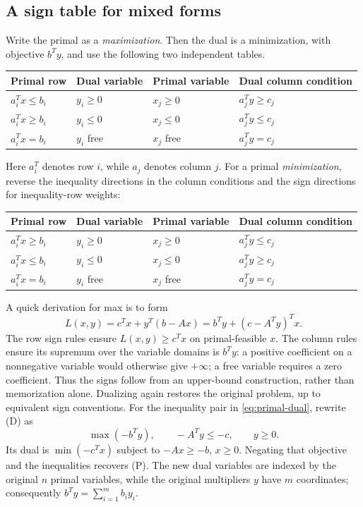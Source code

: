 \documentclass[11pt,a4paper]{article}
\begin{document}
\subsection{A sign table for mixed forms}
Write the primal as a \emph{maximization}. Then the dual is a minimization,
with objective $b^Ty$, and use the following two independent tables.
\begin{center}
  \begin{tabular}{ll@{\qquad}ll}\toprule
    Primal row & Dual variable & Primal variable & Dual column condition\\\midrule
    $a_i^Tx\leq b_i$ & $y_i\geq0$ & $x_j\geq0$ & $a_j^Ty\geq c_j$\\
    $a_i^Tx\geq b_i$ & $y_i\leq0$ & $x_j\leq0$ & $a_j^Ty\leq c_j$\\
    $a_i^Tx=b_i$ & $y_i$ free & $x_j$ free & $a_j^Ty=c_j$\\\bottomrule
  \end{tabular}
\end{center}
Here $a_i^T$ denotes row $i$, while $a_j$ denotes column $j$.
For a primal \emph{minimization}, reverse the inequality directions in the
column conditions and the sign directions for inequality-row weights:
\begin{center}
  \begin{tabular}{ll@{\qquad}ll}\toprule
    Primal row & Dual variable & Primal variable & Dual column condition\\\midrule
    $a_i^Tx\geq b_i$ & $y_i\geq0$ & $x_j\geq0$ & $a_j^Ty\leq c_j$\\
    $a_i^Tx\leq b_i$ & $y_i\leq0$ & $x_j\leq0$ & $a_j^Ty\geq c_j$\\
    $a_i^Tx=b_i$ & $y_i$ free & $x_j$ free & $a_j^Ty=c_j$\\\bottomrule
  \end{tabular}
\end{center}
A quick derivation for max is to form
\[
  L(x,y)=c^Tx+y^T(b-Ax)=b^Ty+(c-A^Ty)^Tx.
\]
The row sign rules ensure $L(x,y)\geq c^Tx$ on primal-feasible $x$.
The column rules ensure its supremum over the variable domains is $b^Ty$:
a positive coefficient on a nonnegative variable would otherwise give $+\infty$;
a free variable requires a zero coefficient. Thus the signs follow from an
upper-bound construction, rather than memorization alone.
Dualizing again restores the original problem, up to equivalent sign conventions.
For the inequality pair in \eqref{eq:primal-dual}, rewrite (D) as
\[
  \max(-b^Ty),\qquad -A^Ty\leq-c,\qquad y\geq0.
\]
Its dual is $\min(-c^Tx)$ subject to $-Ax\geq-b$, $x\geq0$.
Negating that objective and the inequalities recovers (P). The new dual
variables are indexed by the original $n$ primal variables, while the original
multipliers $y$ have $m$ coordinates; consequently $b^Ty=\sum_{i=1}^m b_i y_i$.
\end{document}
